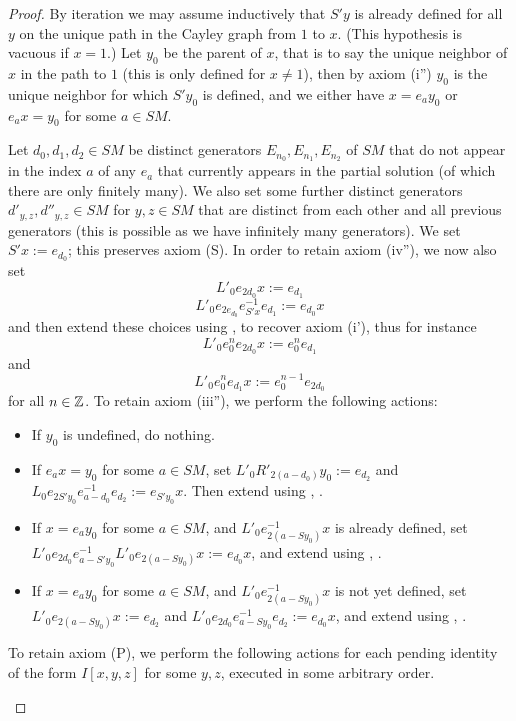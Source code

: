 \begin{proof} By iteration we may assume inductively that $S'y$ is already defined for all $y$ on the unique path in the Cayley graph from $1$ to $x$.  (This hypothesis is vacuous if $x=1$.)  Let $y_0$ be the parent of $x$, that is to say the unique neighbor of $x$ in the path to $1$ (this is only defined for $x \neq 1$), then by axiom (i'') $y_0$ is the unique neighbor for which $S'y_0$ is defined, and we either have $x = e_a y_0$ or $e_a x = y_0$ for some $a \in SM$.

Let $d_0, d_1, d_2 \in SM$ be distinct generators $E_{n_0}, E_{n_1}, E_{n_2}$ of $SM$ that do not appear in the index $a$ of any $e_a$ that currently appears in the partial solution (of which there are only finitely many).  We also set some further distinct generators $d'_{y,z}, d''_{y,z} \in SM$ for $y,z \in SM$ that are distinct from each other and all previous generators (this is possible as we have infinitely many generators).  We set $S'x := e_{d_0}$; this preserves axiom (S).  In order to retain axiom (iv''), we now also set
$$ L'_0 e_{2d_0} x := e_{d_1}$$
$$ L'_0 e_{2e_{d_0}} e_{S'x}^{-1} e_{d_1} := e_{d_0} x$$
and then extend these choices using ,  to recover axiom (i'), thus for instance
$$ L'_0 e_0^n e_{2d_0} x := e_0^n e_{d_1}$$
and
$$ L'_0 e_0^n e_{d_1} x := e_0^{n-1} e_{2d_0}$$
for all $n \in \mathbb{Z}$.  To retain axiom (iii''), we perform the following actions:
\begin{itemize}
\item If $y_0$ is undefined, do nothing.
\item If $e_a x = y_0$ for some $a \in SM$, set $L'_0 R'_{2(a-d_0)} y_0 := e_{d_2}$ and $L_0 e_{2S'y_0} e_{a-d_0}^{-1} e_{d_2} := e_{S'y_0} x$.  Then extend using , .
\item If $x = e_a y_0$ for some $a \in SM$, and $L'_0 e_{2(a-Sy_0)}^{-1} x$ is already defined, set $L'_0 e_{2d_0} e^{-1}_{a-S'y_0} L'_0 e_{2(a-Sy_0)} x :=e_{d_0}x$, and extend using , .
\item If $x = e_a y_0$ for some $a \in SM$, and $L'_0 e_{2(a-Sy_0)}^{-1} x$ is not yet defined, set $L'_0 e_{2(a-Sy_0)} x := e_{d_2}$ and $L'_0 e_{2d_0} e_{a-Sy_0}^{-1} e_{d_2} := e_{d_0} x$, and extend using , .
\end{itemize}
To retain axiom (P), we perform the following actions for each pending identity of the form $I[x,y,z]$ for some $y,z$, executed in some arbitrary order.
\begin{itemize}

\end{itemize}
\end{proof}
